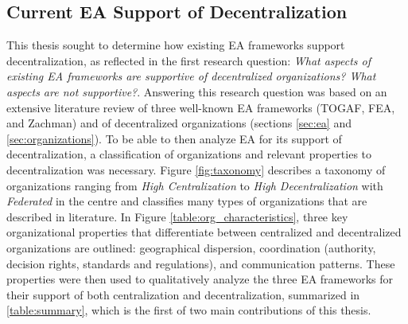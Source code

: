 %
%
%
\subsection{Current EA Support of Decentralization}

This thesis sought to determine how existing EA frameworks support decentralization, as reflected in the first research question: \textit{What aspects of existing EA frameworks are supportive of decentralized organizations? What aspects are not supportive?}. Answering this research question was based on an extensive literature review of three well-known EA frameworks (TOGAF, FEA, and Zachman) and of decentralized organizations (sections \ref{sec:ea} and \ref{sec:organizations}). To be able to then analyze EA for its support of decentralization, a classification of organizations and relevant properties to decentralization was necessary. Figure \ref{fig:taxonomy} describes a taxonomy of organizations ranging from \textit{High Centralization} to \textit{High Decentralization} with \textit{Federated} in the centre and classifies many types of organizations that are described in literature. In Figure \ref{table:org_characteristics}, three key organizational properties that differentiate between centralized and decentralized organizations are outlined: geographical dispersion, coordination (authority, decision rights, standards and regulations), and communication patterns. These properties were then used to qualitatively analyze the three EA frameworks for their support of both centralization and decentralization, summarized in \ref{table:summary}, which is the first of two main contributions of this thesis.

